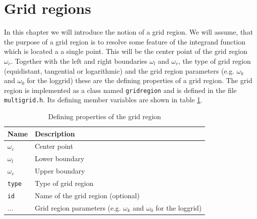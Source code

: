 \section{Grid regions}\label{sec:grid_regions}
In this chapter we will introduce the notion of a grid region. We will assume, that the purpose of a grid region is to resolve some feature of the integrand function which is located a a single point. This will be the center point of the grid region $\omega_c$. Together with the left and right boundaries $\omega_l$ and $\omega_r$, the type of grid region (equidistant, tangential or logarithmic) and the grid region parameters (e.g. $\omega_k$ and $\omega_0$ for the loggrid) these are the defining properties of a grid region. The grid region is implemented as a class named \texttt{gridregion} and is defined in the file \texttt{multigrid.h}. Its defining member variables are shown in table \ref{tab:grid_region_defining_members}.
\begin{table}[h]
	\begin{center}
		\begin{tabular}{ll}
		Name & Description \\ 
		\hline
		$\omega_c$  & Center point \\
		$\omega_l$  & Lower boundary \\
		$\omega_r$  & Upper boundary \\
		\texttt{type}  & Type of grid region \\
		\texttt{id}  & Name of the grid region (optional) \\
		 $\dots$ & Grid region parameters (e.g. $\omega_k$ and $\omega_0$ for the loggrid) \\
		\end{tabular}
	\end{center}
	\caption{Defining properties of the grid region}
	\label{tab:grid_region_defining_members}
\end{table}

